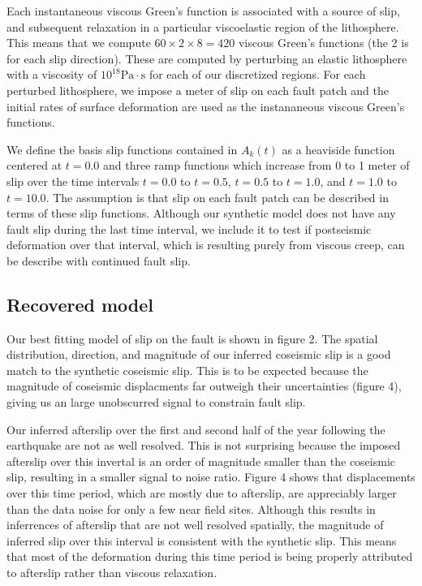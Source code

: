 \documentclass[12pt]{article}
\begin{document}
Each instantaneous viscous Green’s function is associated with a
source of slip, and subsequent relaxation in a particular viscoelastic
region of the lithosphere.  This means that we compute
$60\times2\times8=420$ viscous Green's functions (the 2 is for each
slip direction).  These are computed by perturbing an elastic
lithosphere with a viscosity of $10^{18}\mathrm{Pa}\cdot\mathrm{s}$
for each of our discretized regions.  For each perturbed lithosphere,
we impose a meter of slip on each fault patch and the initial rates of
surface deformation are used as the instananeous viscous Green's
functions.

We define the basis slip functions contained in $A_k(t)$ as a
heaviside function centered at $t=0.0$ and three ramp functions which
increase from 0 to 1 meter of slip over the time intervals $t=0.0$ to
$t=0.5$, $t=0.5$ to $t=1.0$, and $t=1.0$ to $t=10.0$.  The assumption
is that slip on each fault patch can be described in terms of these
slip functions.  Although our synthetic model does not have any fault
slip during the last time interval, we include it to test if
postseismic deformation over that interval, which is resulting purely
from viscous creep, can be describe with continued fault slip.

\subsection{Recovered model}

Our best fitting model of slip on the fault is shown in figure 2.  The
spatial distribution, direction, and magnitude of our inferred
coseismic slip is a good match to the synthetic coseismic slip.  This
is to be expected because the magnitude of coseismic displacments far
outweigh their uncertainties (figure 4), giving us an large
unobscurred signal to constrain fault slip.  

Our inferred afterslip over the first and second half of the year
following the earthquake are not as well resolved.  This is not
surprising because the imposed afterslip over this invertal is an
order of magnitude smaller than the coseismic slip, resulting in a
smaller signal to noise ratio.  Figure 4 shows that displacements over
this time period, which are mostly due to afterslip, are appreciably
larger than the data noise for only a few near field sites.  Although
this results in inferrences of afterslip that are not well resolved
spatially, the magnitude of inferred slip over this interval is
consistent with the synthetic slip.  This means that most of the
deformation during this time period is being properly attributed to
afterslip rather than viscous relaxation.
\end{document}
